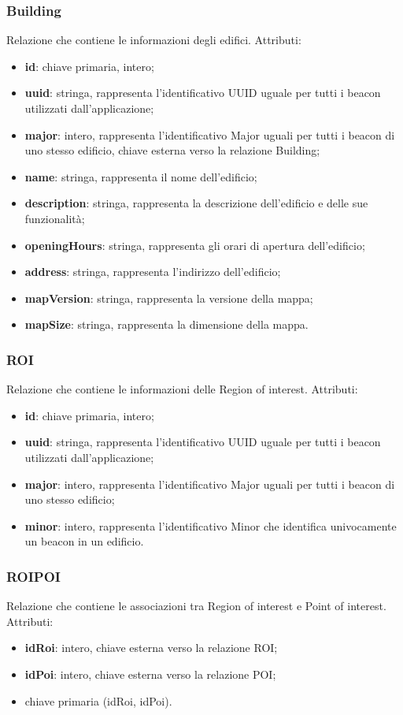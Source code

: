 \documentclass[../ManualeSviluppatore.tex]{subfiles}
\begin{document}
		\subsubsection{Building}
		Relazione che contiene le informazioni degli edifici. Attributi:
		\begin{itemize}
			\item \textbf{id}: chiave primaria, intero;
			\item \textbf{uuid}: stringa, rappresenta l'identificativo UUID uguale per tutti i beacon utilizzati dall'applicazione;
			\item \textbf{major}: intero, rappresenta l'identificativo Major uguali per tutti i beacon di uno stesso edificio, chiave esterna verso la relazione Building;
			\item \textbf{name}: stringa, rappresenta il nome dell'edificio;
			\item \textbf{description}: stringa, rappresenta la descrizione dell'edificio e delle sue funzionalità;
			\item \textbf{openingHours}: stringa, rappresenta gli orari di apertura dell'edificio;
			\item \textbf{address}: stringa, rappresenta l'indirizzo dell'edificio;
			\item \textbf{mapVersion}: stringa, rappresenta la versione della mappa;
			\item \textbf{mapSize}: stringa, rappresenta la dimensione della mappa.
		\end{itemize}
		\subsubsection{ROI}
		Relazione che contiene le informazioni delle Region of interest. Attributi:
			\begin{itemize}
			\item \textbf{id}: chiave primaria, intero;
			\item \textbf{uuid}: stringa, rappresenta l'identificativo UUID uguale per tutti i beacon utilizzati dall'applicazione;
			\item \textbf{major}: intero, rappresenta l'identificativo Major uguali per tutti i beacon di uno stesso edificio;
			\item \textbf{minor}: intero, rappresenta l'identificativo Minor che identifica univocamente un beacon in un edificio.
			\end{itemize}
		\subsubsection{ROIPOI}
		Relazione che contiene le associazioni tra Region of interest e Point of interest. Attributi:
			\begin{itemize}
			\item \textbf{idRoi}: intero, chiave esterna verso la relazione ROI;
			\item \textbf{idPoi}: intero, chiave esterna verso la relazione POI;
			\item chiave primaria (idRoi, idPoi).
			\end{itemize}
\end{document}

